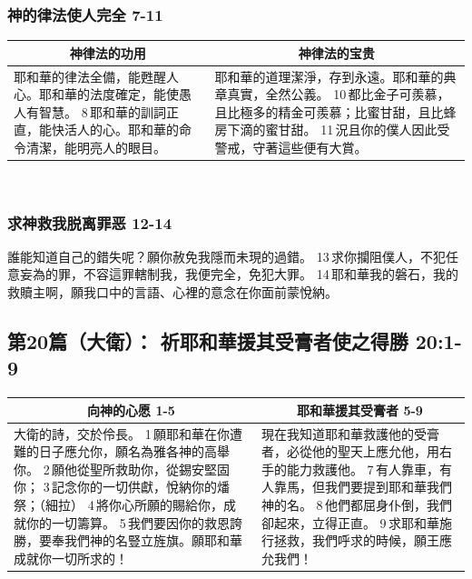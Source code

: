 \subsubsection{神的律法使人完全 7-11}
\begin{table}[H]
\centering
\begin{tabular}{p{6.65cm}|p{10.25cm}}\hline\hline
\multicolumn{1}{c|}{神律法的功用}&\multicolumn{1}{c}{神律法的宝贵}\\\hline
耶和華的律法全備，能甦醒人心。耶和華的法度確定，能使愚人有智慧。
8 耶和華的訓詞正直，能快活人的心。耶和華的命令清潔，能明亮人的眼目。
&耶和華的道理潔淨，存到永遠。耶和華的典章真實，全然公義。
10 都比金子可羨慕，且比極多的精金可羨慕；比蜜甘甜，且比蜂房下滴的蜜甘甜。
11 況且你的僕人因此受警戒，守著這些便有大賞。\\\hline
\end{tabular}
\end{table} 

\subsubsection{求神救我脱离罪恶 12-14}
誰能知道自己的錯失呢？願你赦免我隱而未現的過錯。
13 求你攔阻僕人，不犯任意妄為的罪，不容這罪轄制我，我便完全，免犯大罪。
14 耶和華我的磐石，我的救贖主啊，願我口中的言語、心裡的意念在你面前蒙悅納。


\subsection{第20篇（大衛）： 祈耶和華援其受膏者使之得勝 20:1-9}
\begin{table}[H]
\centering
\begin{tabular}{p{6.65cm}|p{10.25cm}}\hline\hline
\multicolumn{1}{c|}{向神的心愿 1-5}&\multicolumn{1}{c}{耶和華援其受膏者 5-9}\\\hline
大衛的詩，交於伶長。
1 願耶和華在你遭難的日子應允你，願名為雅各神的高舉你。
2 願他從聖所救助你，從錫安堅固你；
3 記念你的一切供獻，悅納你的燔祭；（細拉）
4 將你心所願的賜給你，成就你的一切籌算。
5 我們要因你的救恩誇勝，要奉我們神的名豎立旌旗。願耶和華成就你一切所求的！
&現在我知道耶和華救護他的受膏者，必從他的聖天上應允他，用右手的能力救護他。
7 有人靠車，有人靠馬，但我們要提到耶和華我們神的名。
8 他們都屈身仆倒，我們卻起來，立得正直。
9 求耶和華施行拯救，我們呼求的時候，願王應允我們！\\\hline
\end{tabular}
\end{table} 


